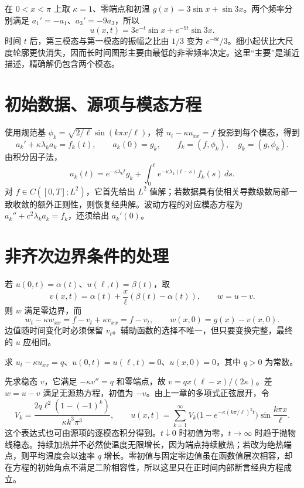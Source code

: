 \documentclass[UTF8,12pt,a4paper,fontset=fandol]{ctexbook}
\begin{document}
\begin{example}[两种空间尺度的消退]
在 $0<x<\pi$ 上取 $\kappa=1$、零端点和初温 $g(x)=3\sin x+\sin3x$。两个频率分别满足 $a_1'=-a_1$、$a_3'=-9a_3$，所以
\[
 u(x,t)=3e^{-t}\sin x+e^{-9t}\sin3x.
\]
时间 $t$ 后，第三模态与第一模态的振幅之比由 $1/3$ 变为 $e^{-8t}/3$。细小起伏比大尺度轮廓更快消失，因而长时间图形主要由最低的非零频率决定。这里“主要”是渐近描述，精确解仍包含两个模态。
\end{example}

\section{初始数据、源项与模态方程}
使用规范基 $\phi_k=\sqrt{2/\ell}\sin(k\pi x/\ell)$，将 $u_t-\kappa u_{xx}=f$ 投影到每个模态，得到
\[
 a_k'+\kappa\lambda_k a_k=f_k(t),\qquad a_k(0)=g_k,
 \qquad f_k=(f,\phi_k),\quad g_k=(g,\phi_k).
\]
由积分因子法，
\begin{equation}
 a_k(t)=e^{-\kappa\lambda_kt}g_k+
 \int_0^t e^{-\kappa\lambda_k(t-s)}f_k(s)\,ds.
 \label{eq:heat-mode-forcing}
\end{equation}
对 $f\in C([0,T];L^2)$，它首先给出 $L^2$ 值解；若数据具有使相关导数级数局部一致收敛的额外正则性，则恢复经典解。波动方程的对应模态方程为 $a_k''+c^2\lambda_k a_k=f_k$，还须给出 $a_k'(0)$。

\section{非齐次边界条件的处理}
若 $u(0,t)=\alpha(t)$、$u(\ell,t)=\beta(t)$，取
\[
 v(x,t)=\alpha(t)+\frac{x}{\ell}(\beta(t)-\alpha(t)),\qquad w=u-v.
\]
则 $w$ 满足零边界，而
\[
 w_t-\kappa w_{xx}=f-v_t+\kappa v_{xx}=f-v_t,\qquad
 w(x,0)=g(x)-v(x,0).
\]
边值随时间变化时必须保留 $v_t$。辅助函数的选择不唯一，但只要变换完整，最终的 $u$ 应相同。

\begin{example}[均匀加热的杆]
求 $u_t-\kappa u_{xx}=q$、$u(0,t)=u(\ell,t)=0$、$u(x,0)=0$，其中 $q>0$ 为常数。
\end{example}
\begin{solve}
先求稳态 $v$，它满足 $-\kappa v''=q$ 和零端点，故 $v=q x(\ell-x)/(2\kappa)$。差 $w=u-v$ 满足无源热方程，初值为 $-v$。由上一章的多项式正弦展开，令
\[
 V_k=\frac{2q\ell^2(1-(-1)^k)}{\kappa k^3\pi^3},
 \qquad
 u(x,t)=\sum_{k=1}^\infty V_k
 \bigl(1-e^{-\kappa(k\pi/\ell)^2t}\bigr)\sin\frac{k\pi x}{\ell}.
\]
这个表达式也可由源项的逐模态积分得到。$t\downarrow0$ 时初值为零，$t\to\infty$ 时趋于抛物线稳态。持续加热并不必然使温度无限增长，因为端点持续散热；若改为绝热端点，则平均温度会以速率 $q$ 增长。零初值与固定零边值虽在函数值层次相容，却在方程的初始角点不满足二阶相容性，所以这里只在正时间内部断言经典方程成立。
\end{solve}
\end{document}
